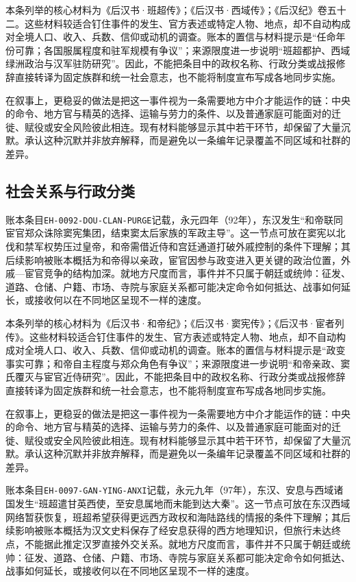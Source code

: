 本条列举的核心材料为《后汉书·班超传》；《后汉书·西域传》；《后汉纪》卷五十二。这些材料较适合钉住事件的发生、官方表述或特定人物、地点，却不自动构成对全境人口、收入、兵数、信仰或动机的调查。账本的置信与材料提示是“任命年份可靠；各国服属程度和驻军规模有争议”；来源限度进一步说明“班超都护、西域绿洲政治与汉军驻防研究”。因此，不能把条目中的政权名称、行政分类或战报修辞直接转译为固定族群和统一社会意志，也不能将制度宣布写成各地同步实施。

在叙事上，更稳妥的做法是把这一事件视为一条需要地方中介才能运作的链：中央的命令、地方官与精英的选择、运输与劳力的条件、以及普通家庭可能面对的迁徙、赋役或安全风险彼此相连。现有材料能够显示其中若干环节，却保留了大量沉默。承认这种沉默并非放弃解释，而是避免以一条编年记录覆盖不同区域和社群的差异。

\subsection{社会关系与行政分类}

账本条目\texttt{EH-0092-DOU-CLAN-PURGE}记载，永元四年（92年），东汉发生“和帝联同宦官郑众诛除窦宪集团，结束窦太后家族的军政主导”。这一节点可放在窦宪以北伐和禁军权势压过皇帝，和帝需借近侍和宫廷通道打破外戚控制的条件下理解；其后续影响被账本概括为和帝得以亲政，宦官因参与政变进入更关键的政治位置，外戚—宦官竞争的结构加深。就地方尺度而言，事件并不只属于朝廷或统帅：征发、道路、仓储、户籍、市场、寺院与家庭关系都可能决定命令如何抵达、战事如何延长，或接收何以在不同地区呈现不一样的速度。

本条列举的核心材料为《后汉书·和帝纪》；《后汉书·窦宪传》；《后汉书·宦者列传》。这些材料较适合钉住事件的发生、官方表述或特定人物、地点，却不自动构成对全境人口、收入、兵数、信仰或动机的调查。账本的置信与材料提示是“政变事实可靠；和帝自主程度与郑众角色有争议”；来源限度进一步说明“和帝亲政、窦氏覆灭与宦官近侍研究”。因此，不能把条目中的政权名称、行政分类或战报修辞直接转译为固定族群和统一社会意志，也不能将制度宣布写成各地同步实施。

在叙事上，更稳妥的做法是把这一事件视为一条需要地方中介才能运作的链：中央的命令、地方官与精英的选择、运输与劳力的条件、以及普通家庭可能面对的迁徙、赋役或安全风险彼此相连。现有材料能够显示其中若干环节，却保留了大量沉默。承认这种沉默并非放弃解释，而是避免以一条编年记录覆盖不同区域和社群的差异。

账本条目\texttt{EH-0097-GAN-YING-ANXI}记载，永元九年（97年），东汉、安息与西域诸国发生“班超遣甘英西使，至安息属地而未能到达大秦”。这一节点可放在东汉西域网络暂获恢复，班超希望获得更远西方政权和海陆路线的情报的条件下理解；其后续影响被账本概括为汉文史料保存了经安息获得的西方地理知识，但旅行未达终点，不能据此推定汉罗直接外交关系。就地方尺度而言，事件并不只属于朝廷或统帅：征发、道路、仓储、户籍、市场、寺院与家庭关系都可能决定命令如何抵达、战事如何延长，或接收何以在不同地区呈现不一样的速度。

